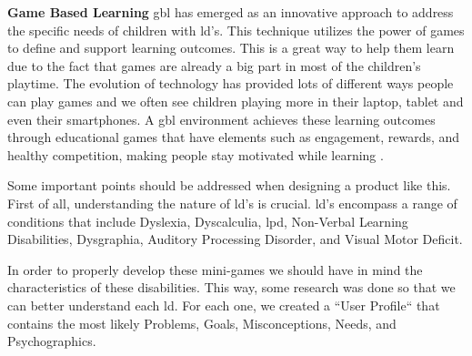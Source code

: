 \textbf{Game Based Learning} \acrshort{gbl} has emerged as an innovative approach to address the specific needs of children with \gls{ld}'s. This technique utilizes the power of games to define and support learning outcomes. This is a great way to help them learn due to the fact that games are already a big part in most of the children's playtime. The evolution of technology has provided lots of different ways people can play games and we often see children playing more in their laptop, tablet and even their smartphones. A \acrshort{gbl} environment achieves these learning outcomes through educational games that have elements such as engagement, rewards, and healthy competition, making people stay motivated while learning \cite{gblProsCons}.


Some important points should be addressed when designing a product like this. First of all, understanding the nature of \acrshort{ld}'s is crucial. \gls{ld}'s encompass a range of conditions that include Dyslexia, Dyscalculia, \acrfull{lpd}, Non-Verbal Learning Disabilities, Dysgraphia, Auditory Processing Disorder, and Visual Motor Deficit.

In order to properly develop these mini-games we should have in mind the characteristics of these disabilities. This way, some research was done so that we can better understand each \acrshort{ld}. For each one, we created a ``User Profile`` that contains the most likely Problems, Goals, Misconceptions, Needs, and Psychographics.